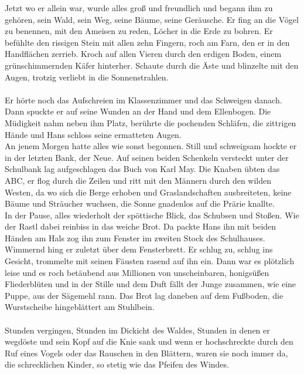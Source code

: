 Jetzt wo er allein war, wurde alles groß und freundlich und begann ihm zu gehören, sein Wald, sein Weg, seine Bäume, seine Geräusche. Er fing an die Vögel zu benennen, mit den Ameisen zu reden, Löcher in die Erde zu bohren. Er befühlte den rissigen Stein mit allen zehn Fingern, roch am Farn, den er in den Handflächen zerrieb. Kroch auf allen Vieren durch den erdigen Boden, einem grünschimmernden Käfer hinterher. Schaute durch die Äste und blinzelte mit den Augen, trotzig verliebt in die Sonnenstrahlen.\\\\
Er hörte noch das Aufschreien im Klassenzimmer und das Schweigen danach. Dann spuckte er auf seine Wunden an der Hand und dem Ellenbogen. Die Müdigkeit nahm neben ihm Platz, berührte die pochenden Schläfen, die zittrigen Hände und Hans schloss seine ermatteten Augen. \\
An jenem Morgen hatte alles wie sonst begonnen. Still und schweigsam hockte er in der letzten Bank, der Neue. Auf seinen beiden Schenkeln versteckt unter der Schulbank lag aufgeschlagen das Buch von Karl May. Die Knaben übten das ABC, er flog durch die Zeilen und ritt mit den Männern durch den wilden Westen, da wo sich die Berge erhoben und Graslandschaften ausbreiteten, keine Bäume und Sträucher wuchsen, die Sonne gnadenlos auf die Prärie knallte. \\
In der Pause, alles wiederholt der spöttische Blick, das Schubsen und Stoßen. Wie der Rastl dabei reinbiss in das weiche Brot. Da packte Hans ihn mit beiden Händen am Hals zog ihn zum Fenster im zweiten Stock des Schulhauses. Wimmernd hing er zuletzt über dem Fensterbrett. Er schlug zu, schlug ins Gesicht, trommelte mit seinen Fäusten rasend auf ihn ein. Dann war es plötzlich leise und es roch betäubend aus Millionen von unscheinbaren, honigsüßen Fliederblüten und in der Stille und dem Duft fällt der Junge zusammen, wie eine Puppe, aus der Sägemehl rann. Das Brot lag daneben auf dem Fußboden, die Wurstscheibe hingeblättert am Stuhlbein. \\\\
Stunden vergingen, Stunden im Dickicht des Waldes, Stunden in denen er wegdöste und sein Kopf auf die Knie sank und wenn er hochschreckte durch den Ruf eines Vogels oder das Rauschen in den Blättern, waren sie noch immer da, die schrecklichen Kinder, so stetig wie das Pfeifen des Windes. \\\\

